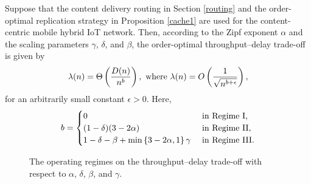 \documentclass[10pt,journal,compsoc,onecolumn]{IEEEtran}
\begin{document}
\begin{thm} \label{thm2} Suppose that the content delivery routing in Section \ref{routing} and the order-optimal replication strategy in Proposition \ref{cache1} are used for the content-centric mobile hybrid IoT network. Then, according to the Zipf exponent $\alpha$ and the scaling parameters $\gamma$, $\delta$, and $\beta$, the order-optimal throughput--delay trade-off is given by
\begin{equation}
\lambda(n)=\Theta\left(\frac{D(n)}{n^{b}}\right),  \textnormal{ where }  \lambda(n)=O\left(\frac{1}{\sqrt{n^{b+\epsilon}}}\right),\nonumber
\end{equation}
for an arbitrarily small constant $\epsilon> 0$. Here,
\begin{equation}
b=
\begin{cases}
0  & \textnormal{ in Regime I},\\
(1-\delta)(3-2\alpha) &  \textnormal{ in Regime II},\\
1-\delta-\beta+\min \left\lbrace3-2\alpha,1\right\rbrace  \gamma & \textnormal{ in Regime III}.
\end{cases}\nonumber
\end{equation}
\end{thm}
\begin{figure}[t!]
    \centering
    \caption{\small{The  operating  regimes  on  the  throughput--delay trade-off  with  respect to $\alpha$, $\delta$, $\beta$, and $\gamma$.}}
    \label{regime}
\end{figure}
\end{document}
